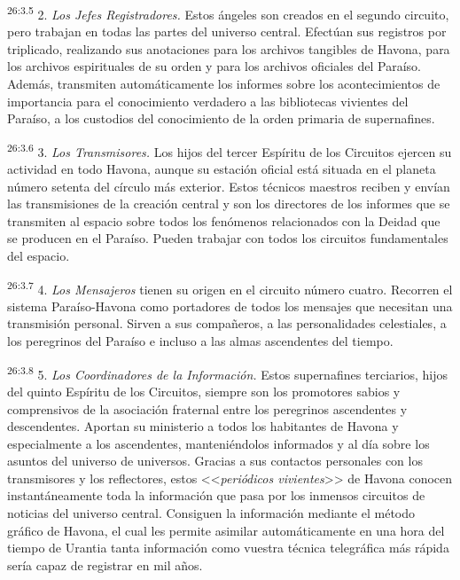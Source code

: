 \par
\textsuperscript{26:3.5} 2. \textit{Los Jefes Registradores.} Estos ángeles son creados en el segundo circuito, pero trabajan en todas las partes del universo central. Efectúan sus registros por triplicado, realizando sus anotaciones para los archivos tangibles de Havona, para los archivos espirituales de su orden y para los archivos oficiales del Paraíso. Además, transmiten automáticamente los informes sobre los acontecimientos de importancia para el conocimiento verdadero a las bibliotecas vivientes del Paraíso, a los custodios del conocimiento de la orden primaria de supernafines.

\par
\textsuperscript{26:3.6} 3. \textit{Los Transmisores.} Los hijos del tercer Espíritu de los Circuitos ejercen su actividad en todo Havona, aunque su estación oficial está situada en el planeta número setenta del círculo más exterior. Estos técnicos maestros reciben y envían las transmisiones de la creación central y son los directores de los informes que se transmiten al espacio sobre todos los fenómenos relacionados con la Deidad que se producen en el Paraíso. Pueden trabajar con todos los circuitos fundamentales del espacio.

\par
\textsuperscript{26:3.7} 4. \textit{Los Mensajeros} tienen su origen en el circuito número cuatro. Recorren el sistema Paraíso-Havona como portadores de todos los mensajes que necesitan una transmisión personal. Sirven a sus compañeros, a las personalidades celestiales, a los peregrinos del Paraíso e incluso a las almas ascendentes del tiempo.

\par
\textsuperscript{26:3.8} 5. \textit{Los Coordinadores de la Información.} Estos supernafines terciarios, hijos del quinto Espíritu de los Circuitos, siempre son los promotores sabios y comprensivos de la asociación fraternal entre los peregrinos ascendentes y descendentes. Aportan su ministerio a todos los habitantes de Havona y especialmente a los ascendentes, manteniéndolos informados y al día sobre los asuntos del universo de universos. Gracias a sus contactos personales con los transmisores y los reflectores, estos <<\textit{periódicos vivientes}>> de Havona conocen instantáneamente toda la información que pasa por los inmensos circuitos de noticias del universo central. Consiguen la información mediante el método gráfico de Havona, el cual les permite asimilar automáticamente en una hora del tiempo de Urantia tanta información como vuestra técnica telegráfica más rápida sería capaz de registrar en mil años.

